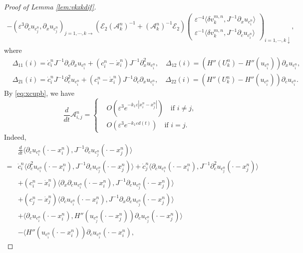 \documentclass[11pt]{amsart}
\theoremstyle{remark}
\numberwithin{equation}{section}
\begin{document}
\begin{proof}[Proof of Lemma \ref{lem:vkxkdif}]
\begin{align*}
-({\varepsilon}^3{\partial}_cu_{c_j^n},{\partial}_xu_{c_j^n})_{j=1,\cdots,k\rightarrow}
\left(\mathcal{E}_2(\mathcal{A}_k^n)^{-1}+(\mathcal{A}_k^n)^{-1}\mathcal{E}_2
\right)
\begin{pmatrix}
{\varepsilon}^{-4}{\langle} {\delta v}_k^{m,n},J^{-1}{\partial}_xu_{c_i^n}{\rangle} \\
{\varepsilon}^{-1}{\langle} {\delta v}_k^{m,n},J^{-1}{\partial}_cu_{c_i^n}{\rangle}
\end{pmatrix}_{i=1,\cdots,k \downarrow},
\end{align*}  
where
\begin{align*}
& \Delta_{11}(i)=
\dot{c}_i^nJ^{-1}{\partial}_c{\partial}_xu_{c_i^n}+(c_i^n-\dot{x}_i^n)J^{-1}{\partial}_x^2u_{c_i^n},
\quad 
\Delta_{12}(i)=(H''(U_k^n)-H''(u_{c_i^n})){\partial}_xu_{c_i^n},
\\
& \Delta_{21}(i)=
\dot{c}_i^nJ^{-1}{\partial}_c^2u_{c_i^n}+(c_i^n-\dot{x}_i^n)J^{-1}{\partial}_c{\partial}_xu_{c_i^n},
\quad \Delta_{22}(i)=(H''(U_k^n)-H''(u_{c_i^n})){\partial}_cu_{c_i^n}.
\end{align*}
By \eqref{eq:xcupb}, we have
\begin{equation}
  \label{eq:daij}
  \frac{d}{dt}\mathcal{A}_{i,j}^n
=\begin{cases}
& O({\varepsilon}^3e^{-k_1{\varepsilon}|x_i^n-x_j^n|}) \quad\text{if $i\ne j$,}\\
& O({\varepsilon}^3e^{-k_1{\varepsilon} d(t)})\quad\text{if $i=j$.}
\end{cases}
\end{equation}
Indeed,
\begin{align*}
& \frac{d}{dt}{\langle} {\partial}_cu_{c_i^n}(\cdot-x_i^n),J^{-1}{\partial}_cu_{c_j^n}(\cdot-x_j^n){\rangle}
\\=& 
\dot{c}_i^n{\langle} {\partial}_c^2u_{c_i^n}(\cdot-x_i^n),J^{-1}{\partial}_cu_{c_j^n}(\cdot-x_j^n){\rangle}
+\dot{c}_j^n{\langle} {\partial}_cu_{c_i^n}(\cdot-x_i^n),J^{-1}{\partial}_c^2u_{c_j^n}(\cdot-x_j^n){\rangle}
\\ &+(c_i^n-\dot{x}_i^n)
{\langle} {\partial}_x{\partial}_cu_{c_i^n}(\cdot-x_i^n),J^{-1}{\partial}_cu_{c_j^n}(\cdot-x_j^n){\rangle}
\\ &+(c_j^n-\dot{x}_j^n)
{\langle} {\partial}_cu_{c_i^n}(\cdot-x_i^n),J^{-1}{\partial}_x{\partial}_cu_{c_j^n}(\cdot-x_j^n){\rangle}
\\ & + {\langle} {\partial}_cu_{c_i^n}(\cdot-x_i^n), 
H''(u_{c_j^n}(\cdot-x_j^n)){\partial}_cu_{c_j^n}(\cdot-x_j^n){\rangle}
\\ & -{\langle} H''(u_{c_i^n}(\cdot-x_i^n)){\partial}_cu_{c_i^n}(\cdot-x_i^n),

\end{align*}
\end{proof}
\end{document}
